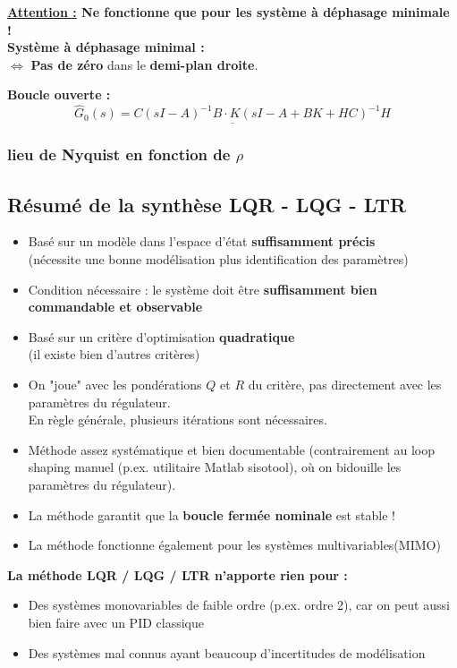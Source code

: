 \documentclass[document.tex]{subfiles}
\begin{document}
\textbf{\underline{Attention :} Ne fonctionne que pour les système à déphasage minimale !} \\

\textbf{Système à déphasage minimal :}\\
$\Leftrightarrow$ \textbf{Pas de zéro} dans le \textbf{demi-plan droite}.

\textbf{Boucle ouverte :}
$$ \underline{\hat{G}_0(s)=C(sI-A)^{-1}B\cdot K(sI-A+BK + HC)^{-1}H} $$


\subsubsection{lieu de Nyquist en fonction de $\rho$}


\subsection{Résumé de la synthèse LQR - LQG - LTR }

\begin{itemize}
 \item Basé sur un modèle dans l'espace d'état \textbf{suffisamment précis} \\ (nécessite une bonne modélisation plus identification des paramètres)
 \item Condition nécessaire : le système doit être \textbf{suffisamment bien commandable et observable}
 \item Basé sur un critère d'optimisation \textbf{quadratique} \\ (il existe bien d'autres critères)
 \item On "joue" avec les pondérations $Q$ et $R$ du critère, pas directement avec les paramètres du régulateur. \\ En règle générale, plusieurs itérations sont nécessaires.
 \item Méthode assez systématique et bien documentable (contrairement au loop shaping manuel (p.ex. utilitaire Matlab sisotool), où on bidouille les paramètres du régulateur).
 \item La méthode garantit que la \textbf{boucle fermée nominale} est stable ! 
 \item La méthode fonctionne également pour les systèmes multivariables(MIMO)
\end{itemize}

\textbf{La méthode LQR / LQG / LTR n'apporte rien pour : }
\begin{itemize}
\item Des systèmes monovariables de faible ordre (p.ex. ordre 2), car on peut aussi bien faire avec un PID classique 
\item Des systèmes mal connus ayant beaucoup d'incertitudes de modélisation
\end{itemize}
\end{document}
